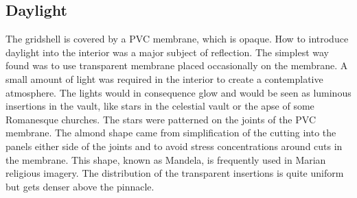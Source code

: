 
\subsection{Daylight}
The gridshell is covered by a PVC membrane, which is opaque. How to introduce daylight into the interior was a major subject of reflection. The simplest way found was to use transparent membrane placed occasionally on the membrane. A small amount of light was required in the interior to create a contemplative atmosphere. The lights would in consequence glow and would be seen as luminous insertions in the vault, like stars in the celestial vault or the apse of some Romanesque churches. The stars were patterned on the joints of the PVC membrane. The almond shape came from simplification of the cutting into the panels either side of the joints and to avoid stress concentrations around cuts in the membrane. This shape, known as Mandela, is frequently used in Marian religious imagery. The distribution of the transparent insertions is quite uniform but gets denser above the pinnacle.

